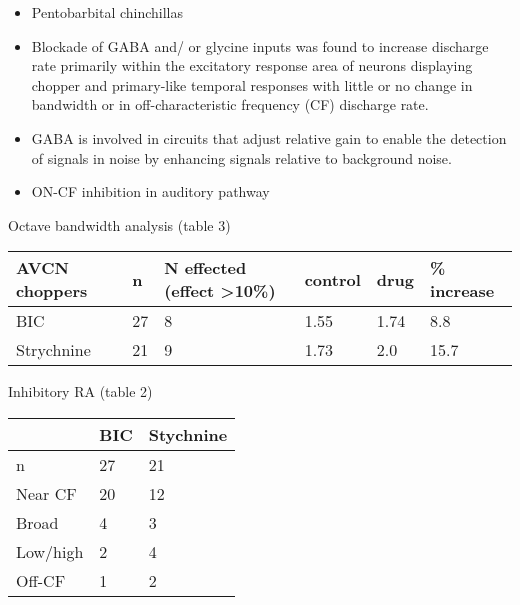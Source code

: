 \documentclass[10pt,a4paper]{article}
\begin{document}
\begin{itemize}
\item Pentobarbital chinchillas
\item Blockade of GABA and/ or glycine inputs was found to increase discharge
  rate primarily within the excitatory response area of neurons displaying
  chopper and primary-like temporal responses with little or no change in
  bandwidth or in off-characteristic frequency (CF) discharge rate.
\end{itemize}

\begin{itemize}
\item GABA is involved in circuits that adjust relative gain to enable the
  detection of signals in noise by enhancing signals relative to background
  noise.
\item ON-CF inhibition in auditory pathway
  \citep{CasparyPalombi:1993,CasparyPalombiEtAl:1993,EvansZhao:1993,PalombiCaspary:1992}
\end{itemize}

Octave bandwidth analysis (table 3)
\begin{flushleft}
  \tablehead{}
  \begin{supertabular}{|m{3.4689999cm}|m{2.659cm}|m{2.659cm}|m{3.1829998cm}|m{2.993cm}|m{3.303cm}|}
    \hline AVCN choppers & n & N effected (effect {\textgreater}10\%) & control
    & drug & \% increase\\\hline BIC & 27 & 8 & 1.55 & 1.74 & 8.8\\\hline
    Strychnine & 21 & 9 & 1.73 & 2.0 & 15.7\\\hline
  \end{supertabular}
\end{flushleft}

Inhibitory RA (table 2)

\begin{flushleft}
  \tablehead{}
  \begin{supertabular}{|m{6.2770004cm}|m{6.2770004cm}|m{6.3120003cm}|}
    \hline & BIC & Stychnine \\\hline n & 27 & 21\\\hline Near CF & 20 &
    12\\\hline Broad & 4 & 3\\\hline Low/high & 2 & 4\\\hline Off-CF & 1 &
    2\\\hline
  \end{supertabular}
\end{flushleft}
\end{document}

